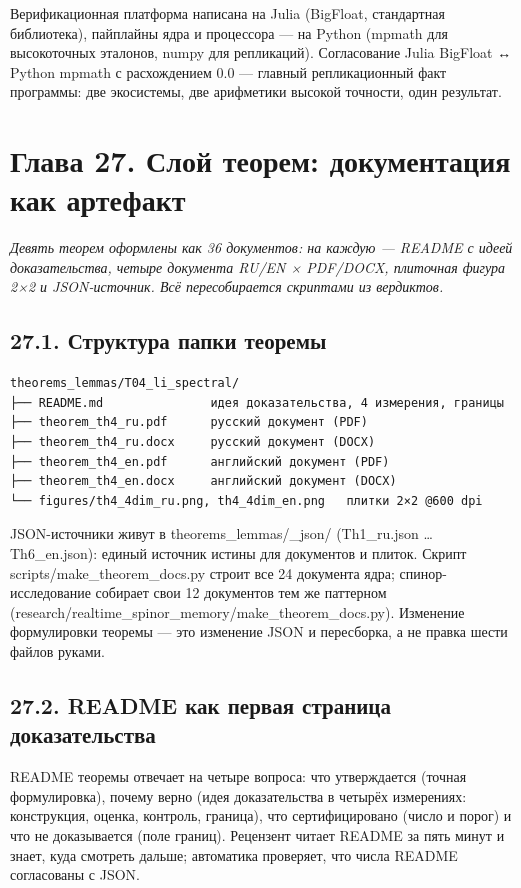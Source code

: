 \documentclass[11pt,a4paper]{article}
\begin{document}
Верификационная платформа написана на Julia (BigFloat, стандартная библиотека), пайплайны ядра и процессора — на Python (mpmath для высокоточных эталонов, numpy для репликаций). Согласование Julia BigFloat ↔ Python mpmath с расхождением 0.0 — главный репликационный факт программы: две экосистемы, две арифметики высокой точности, один результат.

\section{Глава 27. Слой теорем: документация как артефакт}

\noindent\textit{\color{copper}Девять теорем оформлены как 36 документов: на каждую — README с идеей доказательства, четыре документа RU/EN × PDF/DOCX, плиточная фигура 2×2 и JSON-источник. Всё пересобирается скриптами из вердиктов.}

\subsection{27.1. Структура папки теоремы}

\begin{verbatim}
theorems_lemmas/T04_li_spectral/
├── README.md               идея доказательства, 4 измерения, границы
├── theorem_th4_ru.pdf      русский документ (PDF)
├── theorem_th4_ru.docx     русский документ (DOCX)
├── theorem_th4_en.pdf      английский документ (PDF)
├── theorem_th4_en.docx     английский документ (DOCX)
└── figures/th4_4dim_ru.png, th4_4dim_en.png   плитки 2×2 @600 dpi
\end{verbatim}

JSON-источники живут в theorems\_lemmas/\_json/ (Th1\_ru.json … Th6\_en.json): единый источник истины для документов и плиток. Скрипт scripts/make\_theorem\_docs.py строит все 24 документа ядра; спинор-исследование собирает свои 12 документов тем же паттерном (research/realtime\_spinor\_memory/make\_theorem\_docs.py). Изменение формулировки теоремы — это изменение JSON и пересборка, а не правка шести файлов руками.

\subsection{27.2. README как первая страница доказательства}

README теоремы отвечает на четыре вопроса: что утверждается (точная формулировка), почему верно (идея доказательства в четырёх измерениях: конструкция, оценка, контроль, граница), что сертифицировано (число и порог) и что не доказывается (поле границ). Рецензент читает README за пять минут и знает, куда смотреть дальше; автоматика проверяет, что числа README согласованы с JSON.
\end{document}
